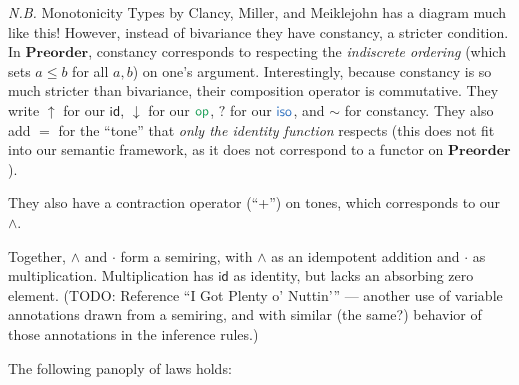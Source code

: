 \documentclass{article}
\newcommand{\todo}[1]{{\color{red}#1}}
\newcommand{\ms}[1]{\ensuremath{\mathsf{#1}}}
\newcommand{\mb}[1]{\ensuremath{\mathbf{#1}}}
\newcommand{\op}{\ms{op}}
\newcommand{\iso}{\ms{iso}}
\newcommand{\tm}{{\ms{id}}}     %
\newcommand{\ta}{{\color{ForestGreen}\ensuremath{\op}}}    %
\newcommand{\ti}{{\color{NavyBlue}\ensuremath{\iso}}} %
\newcommand{\tc}{\cdot}         %
\begin{document}
\emph{N.B.} Monotonicity Types by Clancy, Miller, and Meiklejohn has a diagram
much like this! However, instead of bivariance they have constancy, a stricter
condition.
In \mb{Preorder}, constancy corresponds to respecting the \emph{indiscrete
  ordering} (which sets $a \le b$ for all $a,b$) on one's argument.
Interestingly, because constancy is so much stricter than bivariance, their
composition operator is commutative.
They write $\uparrow$ for our $\tm$, $\downarrow$ for our $\ta$, $?$ for our
$\ti$, and $\sim$ for constancy. They also add $=$ for the ``tone'' that
\emph{only the identity function} respects (this does not fit into our semantic
framework, as it does not correspond to a functor on \mb{Preorder}).

They also have a contraction operator (``+'') on tones, which corresponds to our
$\wedge$.

Together, $\wedge$ and $\tc$ form a semiring, with $\wedge$ as an idempotent
addition and $\tc$ as multiplication. Multiplication has $\tm$ as identity, but
lacks an absorbing zero element. (\todo{TODO: Reference ``I Got Plenty o'
  Nuttin'{}'' --- another use of variable annotations drawn from a semiring, and
  with similar (the same?) behavior of those annotations in the inference
  rules.})

The following panoply of laws holds:
\end{document}
